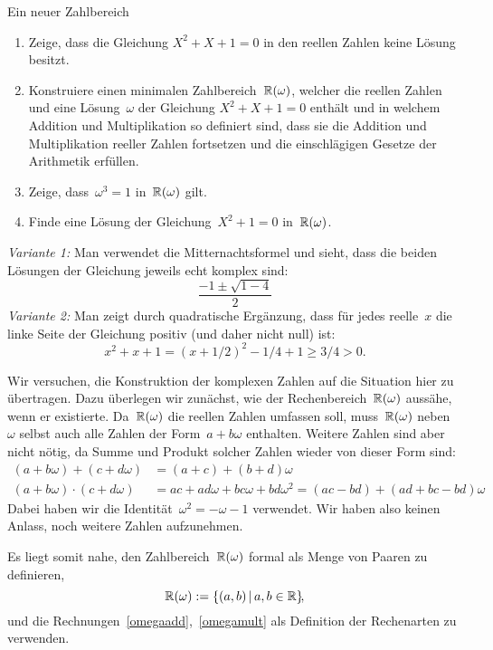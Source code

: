 \documentclass{algblatt}
\begin{document}
\ifloesungen\newpage\fi
\begin{aufgabe}{Ein neuer Zahlbereich}
\begin{enumerate}
\item
Zeige, dass die Gleichung $X^2 + X + 1 = 0$ in den reellen Zahlen
keine Lösung besitzt.
\item
Konstruiere einen minimalen Zahlbereich~$\mathbb{R}(\omega)$, welcher die
reellen Zahlen und eine Lösung~$\omega$ der Gleichung $X^2 + X + 1 = 0$
enthält und in welchem Addition und Multiplikation so definiert sind, dass sie
die Addition und Multiplikation reeller Zahlen fortsetzen und die
einschlägigen Gesetze der Arithmetik erfüllen.
\item Zeige, dass~$\omega^3 = 1$ in~$\mathbb{R}(\omega)$ gilt.
\item Finde eine Lösung der Gleichung~$X^2 + 1 = 0$ in~$\mathbb{R}(\omega)$.
\end{enumerate}
\begin{loesungE}
\item \emph{Variante 1:} Man verwendet die Mitternachtsformel und sieht, dass
die beiden Lösungen der Gleichung jeweils echt komplex sind:
\[ \frac{-1 \pm \sqrt{1 - 4}}{2} \]
\emph{Variante 2:} Man zeigt durch quadratische Ergänzung, dass für jedes
reelle~$x$ die linke Seite der Gleichung positiv (und daher nicht null) ist:
\[ x^2 + x + 1 = (x + 1/2)^2 - 1/4 + 1 \geq 3/4 > 0. \]

\item Wir versuchen, die Konstruktion der komplexen Zahlen auf die Situation
hier zu übertragen. Dazu überlegen wir zunächst, wie der
Rechenbereich~$\mathbb{R}(\omega)$ aussähe, wenn er existierte.
Da~$\mathbb{R}(\omega)$ die reellen Zahlen umfassen soll, muss~$\mathbb{R}(\omega)$
neben~$\omega$ selbst auch alle Zahlen der Form~$a + b\omega$ enthalten.
Weitere Zahlen sind aber nicht nötig, da Summe und Produkt solcher Zahlen
wieder von dieser Form sind:
\begin{align}
  \label{omegaadd}
  (a + b \omega) + (c + d \omega) &= (a+c) + (b+d) \omega \\
  \label{omegamult}
  (a + b \omega) \cdot (c + d \omega) &= ac + ad\omega + bc\omega + bd\omega^2 =
  (ac-bd) + (ad+bc-bd)\omega
\end{align}
Dabei haben wir die Identität~$\omega^2 = -\omega - 1$ verwendet. Wir haben
also keinen Anlass, noch weitere Zahlen aufzunehmen.

Es liegt somit nahe, den Zahlbereich~$\mathbb{R}(\omega)$ formal als Menge von Paaren zu
definieren,
\[ \mathbb{R}(\omega) := \{ (a,b) \,|\, a,b \in \mathbb{R} \}\!, \]
und die Rechnungen~\eqref{omegaadd},~\eqref{omegamult} als Definition der
Rechenarten zu verwenden.


\end{loesungE}
\end{aufgabe}
\end{document}
